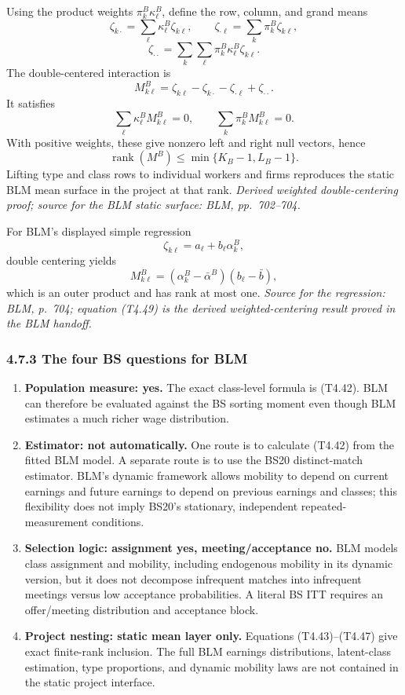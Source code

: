 \documentclass[11pt]{article}
\begin{document}
Using the product weights \(\pi_k^B\kappa_\ell^B\), define the row, column, and
grand means
\[
\zeta_{k\cdot}
=
\sum_\ell\kappa_\ell^B\zeta_{k\ell},
\qquad
\zeta_{\cdot\ell}
=
\sum_k\pi_k^B\zeta_{k\ell},
\tag{T4.43}
\]
\[
\zeta_{\cdot\cdot}
=
\sum_k\sum_\ell
\pi_k^B\kappa_\ell^B\zeta_{k\ell}.
\tag{T4.44}
\]
The double-centered interaction is
\[
M^B_{k\ell}
=
\zeta_{k\ell}
-\zeta_{k\cdot}
-\zeta_{\cdot\ell}
+\zeta_{\cdot\cdot}.
\tag{T4.45}
\]
It satisfies
\[
\sum_\ell\kappa_\ell^BM^B_{k\ell}=0,
\qquad
\sum_k\pi_k^BM^B_{k\ell}=0.
\tag{T4.46}
\]
With positive weights, these give nonzero left and right null vectors, hence
\[
\operatorname{rank}(M^B)
\leq
\min\{K_B-1,L_B-1\}.
\tag{T4.47}
\]
Lifting type and class rows to individual workers and firms reproduces the
static BLM mean surface in the project at that rank.
\textit{Derived weighted double-centering proof; source for the BLM static
surface: BLM, pp.\ 702--704.}

For BLM's displayed simple regression
\[
\zeta_{k\ell}=a_\ell+b_\ell\alpha_k^B,
\tag{T4.48}
\]
double centering yields
\[
M^B_{k\ell}
=
(\alpha_k^B-\bar\alpha^B)
(b_\ell-\bar b),
\tag{T4.49}
\]
which is an outer product and has rank at most one.
\textit{Source for the regression: BLM, p.\ 704; equation (T4.49) is the
derived weighted-centering result proved in the BLM handoff.}

\subsubsection{4.7.3 The four BS questions for BLM}

\begin{enumerate}
\item \textbf{Population measure: yes.}  The exact class-level formula is
  (T4.42).  BLM can therefore be evaluated against the BS sorting moment even
  though BLM estimates a much richer wage distribution.
\item \textbf{Estimator: not automatically.}  One route is to calculate
  (T4.42) from the fitted BLM model.  A separate route is to use the BS20
  distinct-match estimator.  BLM's dynamic framework allows mobility to
  depend on current earnings and future earnings to depend on previous
  earnings and classes; this flexibility does not imply BS20's stationary,
  independent repeated-measurement conditions.
\item \textbf{Selection logic: assignment yes, meeting/acceptance no.}
  BLM models class assignment and mobility, including endogenous mobility in
  its dynamic version, but it does not decompose infrequent matches into
  infrequent meetings versus low acceptance probabilities.  A literal BS
  ITT requires an offer/meeting distribution and acceptance block.
\item \textbf{Project nesting: static mean layer only.}  Equations
  (T4.43)--(T4.47) give exact finite-rank inclusion.  The full BLM earnings
  distributions, latent-class estimation, type proportions, and dynamic
  mobility laws are not contained in the static project interface.
\end{enumerate}
\end{document}

